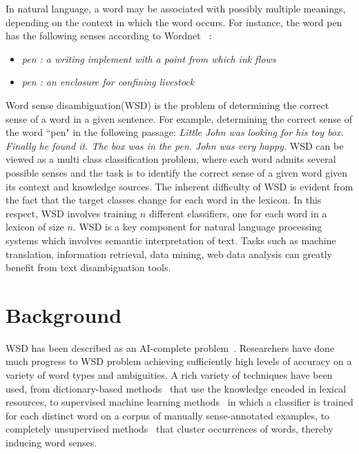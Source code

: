 \documentclass[11pt,letterpaper]{article}
\newcommand{\blue}[1]{\textcolor{RoyalBlue}{#1}}
\newcommand{\instructions}[1]{\blue{\textit{#1}}}
\begin{document}
In natural language, a word may be associated with possibly multiple meanings, depending on the context in which the word occurs. For instance, the word pen has the following senses according to Wordnet ~\cite{wordnet}:
\begin{itemize}
\item \emph{pen : a writing implement with a point from which ink flows}
\item \emph{pen : an enclosure for confining livestock}
\end{itemize}
Word sense disambiguation(WSD) is the problem of determining the correct sense of a word in a given sentence. For example, determining the correct sense of the word ``pen" in the following passage:
\emph{Little John was looking for his toy box. Finally he found it. The box was in the pen. John was very happy.}
WSD can be viewed as a multi class classification problem, where each word admits several possible senses and the task is to identify the correct sense of a given word given its context and knowledge sources. The inherent difficulty of WSD is evident from the fact that the target classes change for each word in the lexicon. In this respect, WSD involves training $n$ different classifiers, one for each word in a lexicon of size $n$. 
WSD is a key component for natural language processing systems which involves semantic interpretation of text. Tasks such as machine translation, information retrieval, data mining, web data analysis can greatly benefit from text disambiguation tools. 


\section{Background}
\label{sec:background}

WSD has been described as an AI-complete problem~\cite{mallery1988thinking}. Researchers have done much progress to WSD problem achieving sufficiently high levels of accuracy on a variety of word types and ambiguities. A rich variety of techniques have been used, from dictionary-based methods~\cite{mihalcea2007using} that use the knowledge encoded in lexical resources, to supervised machine learning methods~\cite{manning1999foundations} in which a classifier is trained for each distinct word on a corpus of manually sense-annotated examples, to completely unsupervised methods~\cite{yarowsky1995unsupervised} that cluster occurrences of words, thereby inducing word senses.
\end{document}
